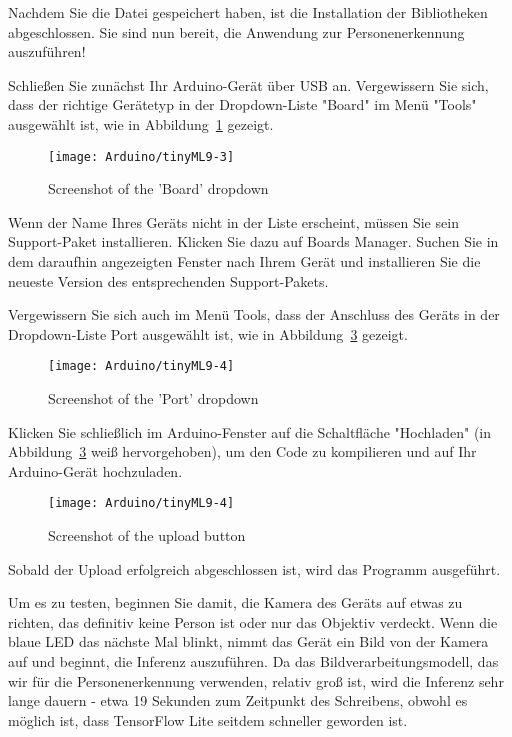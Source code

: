 Nachdem Sie die Datei gespeichert haben, ist die Installation der Bibliotheken abgeschlossen. Sie sind nun bereit, die Anwendung zur Personenerkennung auszuführen!

Schließen Sie zunächst Ihr Arduino-Gerät über USB an. Vergewissern Sie sich, dass der richtige Gerätetyp in der Dropdown-Liste "Board" im Menü "Tools" ausgewählt ist, wie in Abbildung~\ref{tinyML9-3} gezeigt.

\begin{figure}
    \texttt{[image: Arduino/tinyML9-3]}
    \caption{Screenshot of the 'Board' dropdown}\label{tinyML9-3}
\end{figure}


Wenn der Name Ihres Geräts nicht in der Liste erscheint, müssen Sie sein Support-Paket installieren. Klicken Sie dazu auf Boards Manager. Suchen Sie in dem daraufhin angezeigten Fenster nach Ihrem Gerät und installieren Sie die neueste Version des entsprechenden Support-Pakets.

Vergewissern Sie sich auch im Menü Tools, dass der Anschluss des Geräts in der Dropdown-Liste Port ausgewählt ist, wie in Abbildung~\ref{tinyML9-4} gezeigt.

\begin{figure}
    \texttt{[image: Arduino/tinyML9-4]}
    \caption{Screenshot of the 'Port' dropdown}\label{tinyML9-4}
\end{figure}


Klicken Sie schließlich im Arduino-Fenster auf die Schaltfläche "Hochladen" (in Abbildung~\ref{tinyML9-4} weiß hervorgehoben), um den Code zu kompilieren und auf Ihr Arduino-Gerät hochzuladen.


\begin{figure}
    \texttt{[image: Arduino/tinyML9-4]}
    \caption{Screenshot of the upload button}\label{tinyML9-4}
\end{figure}

Sobald der Upload erfolgreich abgeschlossen ist, wird das Programm ausgeführt.

Um es zu testen, beginnen Sie damit, die Kamera des Geräts auf etwas zu richten, das definitiv keine Person ist oder nur das Objektiv verdeckt. Wenn die blaue LED das nächste Mal blinkt, nimmt das Gerät ein Bild von der Kamera auf und beginnt, die Inferenz auszuführen. Da das Bildverarbeitungsmodell, das wir für die Personenerkennung verwenden, relativ groß ist, wird die Inferenz sehr lange dauern - etwa 19 Sekunden zum Zeitpunkt des Schreibens, obwohl es möglich ist, dass TensorFlow Lite seitdem schneller geworden ist.

